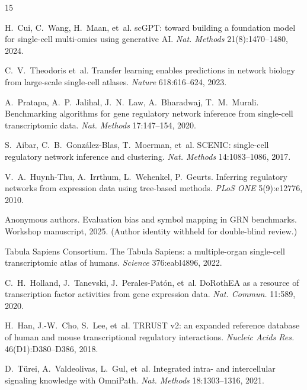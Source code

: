 \documentclass[sigconf,anonymous]{acmart}
\begin{document}
\renewcommand{\bibfont}{\fontsize{4.8}{5.5}\selectfont}
\setlength{\bibsep}{-2pt}

\begingroup
\fontsize{4.8}{5.5}\selectfont
\begin{thebibliography}{15}
\fontsize{4.8}{5.5}\selectfont
\setlength{\itemsep}{0pt}
\setlength{\parsep}{0pt}
\setlength{\parskip}{0pt}
\renewcommand{\newblock}{}

 H.~Cui, C.~Wang, H.~Maan, et~al.
sc{GPT}: toward building a foundation model for single-cell multi-omics using generative {AI}.
\emph{Nat. Methods} 21(8):1470--1480, 2024.

 C.~V.~Theodoris et~al.
Transfer learning enables predictions in network biology from large-scale single-cell atlases.
\emph{Nature} 618:616--624, 2023.

 A.~Pratapa, A.~P.~Jalihal, J.~N.~Law, A.~Bharadwaj, T.~M.~Murali.
Benchmarking algorithms for gene regulatory network inference from single-cell transcriptomic data.
\emph{Nat. Methods} 17:147--154, 2020.

 S.~Aibar, C.~B.~Gonz\'alez-Blas, T.~Moerman, et~al.
{SCENIC}: single-cell regulatory network inference and clustering.
\emph{Nat. Methods} 14:1083--1086, 2017.

 V.~A.~Huynh-Thu, A.~Irrthum, L.~Wehenkel, P.~Geurts.
Inferring regulatory networks from expression data using tree-based methods.
\emph{PLoS ONE} 5(9):e12776, 2010.

 Anonymous authors.
Evaluation bias and symbol mapping in {GRN} benchmarks.
Workshop manuscript, 2025. (Author identity withheld for double-blind review.)

 Tabula Sapiens Consortium.
The {T}abula {S}apiens: a multiple-organ single-cell transcriptomic atlas of humans.
\emph{Science} 376:eabl4896, 2022.

 C.~H.~Holland, J.~Tanevski, J.~Perales-Pat\'on, et~al.
{D}o{R}oth{EA} as a resource of transcription factor activities from gene expression data.
\emph{Nat. Commun.} 11:589, 2020.

 H.~Han, J.-W.~Cho, S.~Lee, et~al.
{TRRUST} v2: an expanded reference database of human and mouse transcriptional regulatory interactions.
\emph{Nucleic Acids Res.} 46(D1):D380--D386, 2018.

 D.~T\"urei, A.~Valdeolivas, L.~Gul, et~al.
Integrated intra- and intercellular signaling knowledge with {O}mni{P}ath.
\emph{Nat. Methods} 18:1303--1316, 2021.


\end{thebibliography}
\end{document}
